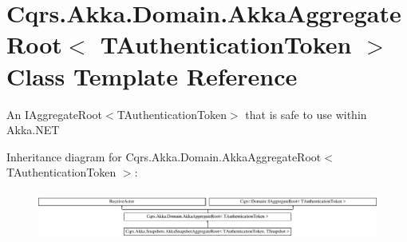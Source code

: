 \hypertarget{classCqrs_1_1Akka_1_1Domain_1_1AkkaAggregateRoot}{}\section{Cqrs.\+Akka.\+Domain.\+Akka\+Aggregate\+Root$<$ T\+Authentication\+Token $>$ Class Template Reference}
\label{classCqrs_1_1Akka_1_1Domain_1_1AkkaAggregateRoot}


An I\+Aggregate\+Root$<$\+T\+Authentication\+Token$>$ that is safe to use within Akka.\+N\+ET  


Inheritance diagram for Cqrs.\+Akka.\+Domain.\+Akka\+Aggregate\+Root$<$ T\+Authentication\+Token $>$\+:\begin{figure}[H]
\begin{center}
\leavevmode
\includegraphics[height=1.612284cm]{classCqrs_1_1Akka_1_1Domain_1_1AkkaAggregateRoot}
\end{center}
\end{figure}
